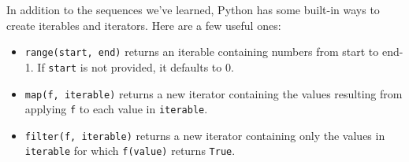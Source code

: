 In addition to the sequences we've learned, Python has some
built-in ways to create iterables and iterators. Here are a few 
useful ones:

\begin{itemize}
	\item \lstinline$range(start, end)$ returns an iterable containing 
	numbers from start to end-1. If \lstinline$start$ is not provided, 
	it defaults to 0.
	\item \lstinline$map(f, iterable)$ returns a new iterator containing 
	the values resulting from applying \lstinline$f$ to each value in 
	\lstinline$iterable$.
	\item \lstinline$filter(f, iterable)$ returns a new iterator containing
	only the values in \lstinline$iterable$ for which \lstinline$f(value)$ returns
	\lstinline$True$.
\end{itemize}